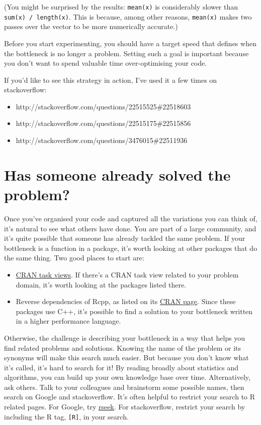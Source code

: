 (You might be surprised by the results: \texttt{mean(x)} is considerably
slower than \texttt{sum(x)\ /\ length(x)}. This is because, among other
reasons, \texttt{mean(x)} makes two passes over the vector to be more
numerically accurate.)

Before you start experimenting, you should have a target speed that
defines when the bottleneck is no longer a problem. Setting such a goal
is important because you don't want to spend valuable time
over-optimising your code.

If you'd like to see this strategy in action, I've used it a few times
on stackoverflow:

\begin{itemize}
\tightlist
\item
  http://stackoverflow.com/questions/22515525\#22518603
\item
  http://stackoverflow.com/questions/22515175\#22515856
\item
  http://stackoverflow.com/questions/3476015\#22511936
\end{itemize}

\hypertarget{already-solved}{%
\section{Has someone already solved the problem?}\label{already-solved}}

Once you've organised your code and captured all the variations you can
think of, it's natural to see what others have done. You are part of a
large community, and it's quite possible that someone has already
tackled the same problem. If your bottleneck is a function in a package,
it's worth looking at other packages that do the same thing. Two good
places to start are:

\begin{itemize}
\item
  \href{http://cran.rstudio.com/web/views/}{CRAN task views}. If there's
  a CRAN task view related to your problem domain, it's worth looking at
  the packages listed there.
\item
  Reverse dependencies of Rcpp, as listed on its
  \href{http://cran.r-project.org/web/packages/Rcpp}{CRAN page}. Since
  these packages use C++, it's possible to find a solution to your
  bottleneck written in a higher performance language.
\end{itemize}

Otherwise, the challenge is describing your bottleneck in a way that
helps you find related problems and solutions. Knowing the name of the
problem or its synonyms will make this search much easier. But because
you don't know what it's called, it's hard to search for it! By reading
broadly about statistics and algorithms, you can build up your own
knowledge base over time. Alternatively, ask others. Talk to your
colleagues and brainstorm some possible names, then search on Google and
stackoverflow. It's often helpful to restrict your search to R related
pages. For Google, try \href{http://www.rseek.org/}{rseek}. For
stackoverflow, restrict your search by including the R tag,
\texttt{{[}R{]}}, in your search. 

